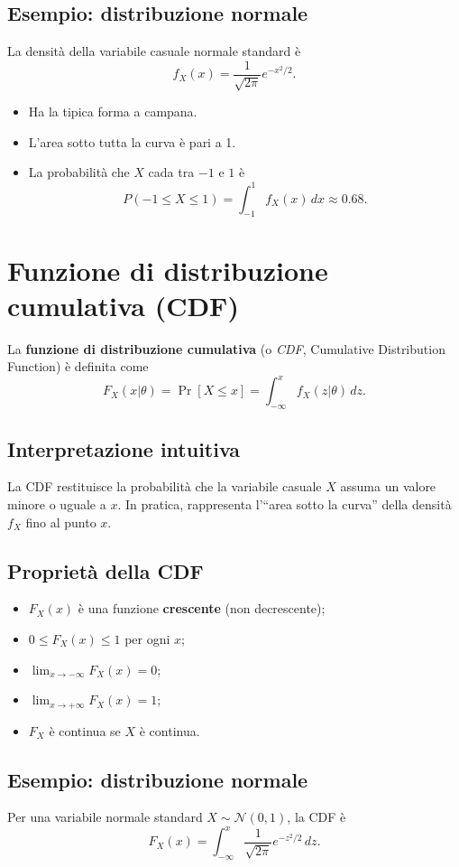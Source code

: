 \documentclass[a4paper,12pt]{article}
\begin{document}
	\subsection*{Esempio: distribuzione normale}
	La densità della variabile casuale normale standard è
	\[
	f_X(x) = \frac{1}{\sqrt{2\pi}} e^{-x^2/2}.
	\]
	
	\begin{itemize}
		\item Ha la tipica forma a campana.
		\item L'area sotto tutta la curva è pari a 1.
		\item La probabilità che $X$ cada tra $-1$ e $1$ è
		\[
		P(-1 \leq X \leq 1) = \int_{-1}^1 f_X(x)\,dx \approx 0.68.
		\]
	\end{itemize}
	
	\section*{Funzione di distribuzione cumulativa (CDF)}
	
	La \textbf{funzione di distribuzione cumulativa} (o \textit{CDF}, Cumulative Distribution Function) è definita come
	\[
	F_X(x|\theta) = \Pr[X \leq x] = \int_{-\infty}^x f_X(z|\theta)\,dz.
	\]
	
	\subsection*{Interpretazione intuitiva}
	La CDF restituisce la probabilità che la variabile casuale $X$ assuma un valore 
	minore o uguale a $x$. In pratica, rappresenta l'``area sotto la curva'' della densità $f_X$ fino al punto $x$.
	
	\subsection*{Proprietà della CDF}
	\begin{itemize}
		\item $F_X(x)$ è una funzione \textbf{crescente} (non decrescente);
		\item $0 \leq F_X(x) \leq 1$ per ogni $x$;
		\item $\lim_{x \to -\infty} F_X(x) = 0$;
		\item $\lim_{x \to +\infty} F_X(x) = 1$;
		\item $F_X$ è continua se $X$ è continua.
	\end{itemize}
	
	\subsection*{Esempio: distribuzione normale}
	Per una variabile normale standard $X \sim \mathcal{N}(0,1)$, la CDF è
	\[
	F_X(x) = \int_{-\infty}^x \frac{1}{\sqrt{2\pi}} e^{-z^2/2}\,dz.
	\]
	
\end{document}
